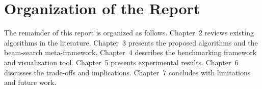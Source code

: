 \section{Organization of the Report}

The remainder of this report is organized as follows. Chapter~2 reviews existing algorithms in the literature. Chapter~3 presents the proposed algorithms and the beam-search meta-framework. Chapter~4 describes the benchmarking framework and visualization tool. Chapter~5 presents experimental results. Chapter~6 discusses the trade-offs and implications. Chapter~7 concludes with limitations and future work.
